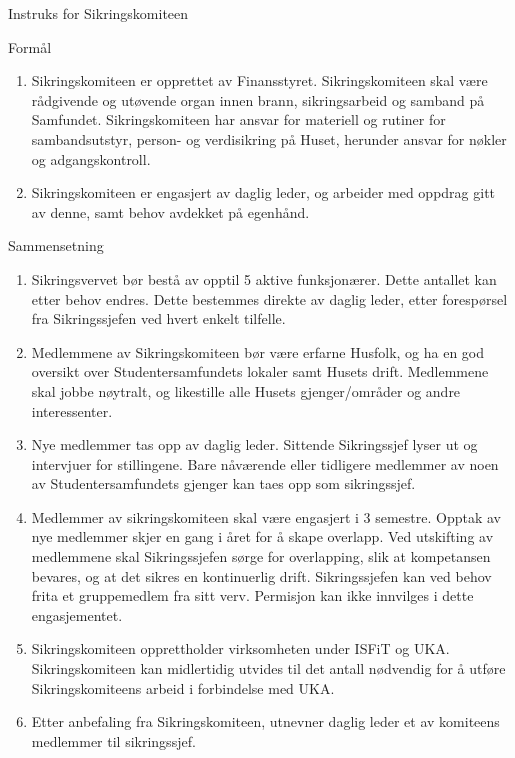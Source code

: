 \begin{instruks*}{Instruks for Sikringskomiteen}
    \begin{instruksledd}{Formål}
        \begin{enumerate}
            \item  Sikringskomiteen er opprettet av Finansstyret. Sikringskomiteen skal
                være rådgivende og utøvende organ
                innen brann, sikringsarbeid og samband på Samfundet. Sikringskomiteen har ansvar
                for materiell og rutiner for sambandsutstyr, person-
                og verdisikring på Huset, herunder ansvar for nøkler og adgangskontroll.
            \item Sikringskomiteen er engasjert av daglig leder, og arbeider med oppdrag
                gitt av denne, samt behov avdekket
                på egenhånd.
        \end{enumerate}
    \end{instruksledd}

    \begin{instruksledd}{Sammensetning}
        \begin{enumerate}
            \item Sikringsvervet bør bestå av opptil 5 aktive funksjonærer. Dette antallet kan etter behov
                endres. Dette bestemmes
                direkte av daglig leder, etter forespørsel fra Sikringssjefen ved hvert enkelt
                tilfelle.
            \item Medlemmene av Sikringskomiteen bør være erfarne Husfolk, og ha en god oversikt over
                Studentersamfundets lokaler samt Husets drift. Medlemmene skal jobbe nøytralt, og
                likestille alle Husets
                gjenger/områder og andre interessenter.
            \item Nye medlemmer tas opp av daglig leder. Sittende Sikringssjef lyser ut og intervjuer
                for stillingene. Bare
                nåværende eller tidligere medlemmer av noen av Studentersamfundets gjenger kan taes
                opp som sikringssjef.
            \item Medlemmer av sikringskomiteen skal være engasjert i 3 semestre. Opptak av nye
                medlemmer skjer en gang i
                året for å skape overlapp. Ved utskifting av medlemmene skal Sikringssjefen sørge for
                overlapping, slik at
                kompetansen bevares, og at det sikres en kontinuerlig drift. Sikringssjefen kan ved
                behov frita et
                gruppemedlem fra sitt verv. Permisjon kan ikke innvilges i dette engasjementet.
	     \item Sikringskomiteen opprettholder virksomheten under ISFiT og UKA.
	        Sikringskomiteen kan midlertidig utvides til det antall nødvendig for å utføre
		Sikringskomiteens arbeid i forbindelse med UKA.
	     \item Etter anbefaling fra Sikringskomiteen, utnevner daglig leder et av komiteens
		medlemmer til sikringssjef.


\end{enumerate}
\end{instruksledd}
\end{instruks*}

